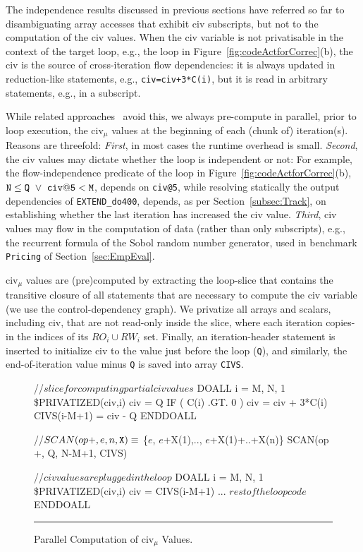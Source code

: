 \documentclass{sig-alternate}
\newcommand{\mymath}[1]{$ #1 $}
\begin{document}
The independence results discussed in previous sections have referred 
so far to disambiguating array accesses that exhibit {\sc civ} 
subscripts, but not to the computation of the {\sc civ} values.
%
When the {\sc civ} variable is not privatisable in the context of the 
target loop, e.g., the loop in Figure~\ref{fig:codeActforCorrec}(b), 
the {\sc civ} is the source of cross-iteration flow dependencies: %
it is always updated in reduction-like statements, e.g., {\tt civ=civ+3*C(i)},
but it is read in arbitrary statements, e.g., in a subscript.


While related approaches~\cite{PaduaStackArr,VEG} avoid this, we always pre-compute in
parallel, prior to loop execution, the {\sc civ}$_\mu$ values at the beginning 
of each (chunk of) iteration(s).
Reasons are threefold: {\em First}, in most cases %
the runtime overhead is small. {\em Second}, the {\sc civ} values may dictate
whether the loop is independent or not: For example,  the flow-independence
predicate of the loop in Figure~\ref{fig:codeActforCorrec}(b), 
${\tt N} \le {\tt Q}~\vee~{\tt civ@5} < {\tt M}$,
depends on {\tt civ@5}, while resolving statically the output 
dependencies of {\tt EXTEND\_do400}, depends, as
per Section~\ref{subsec:Track}, on establishing whether the last
iteration has increased the {\sc civ} value. 
%
{\em Third}, {\sc civ} values may flow in the computation
of data (rather than only subscripts), e.g., the recurrent
formula of the Sobol random number generator, used in
benchmark {\tt Pricing}  of Section~\ref{sec:EmpEval}.

{\sc civ}$_\mu$ values are (pre)computed by extracting the loop-slice
that contains the transitive closure of all statements 
that are necessary to compute the {\sc civ} variable
(we use the control-dependency graph). 
We privatize all arrays and scalars, including {\sc civ}, that are not 
read-only inside the slice, where each iteration copies-in the  indices 
of its $RO_i \cup RW_i$ set. Finally, an iteration-header statement is 
inserted to initialize {\sc civ} to the value just before the loop ({\tt Q}), 
and similarly, the end-of-iteration value minus {\tt Q} is saved into array 
{\tt CIVS}.  


\begin{figure}
\begin{colorcode}
//\mymath{slice for computing partial civ values}
DOALL i = M, N, 1      \$PRIVATIZED(civ,i)
  civ = Q
  IF ( C(i) .GT. 0 ) civ = civ + 3*C(i)
  CIVS(i-M+1) = civ - Q
ENDDOALL

//\mymath{SCAN(op {\tt{}+}, e, n, {\tt{}X}) \equiv} \{\mymath{e}, \mymath{e}+X(1),.., \mymath{e}+X(1)+..+X(n)\}
SCAN(op +, Q, N-M+1, CIVS)

//\mymath{civ values are plugged in the loop}
DOALL i = M, N, 1      \$PRIVATIZED(civ,i)
  civ = CIVS(i-M+1)
  ... \mymath{rest of the loop code}
ENDDOALL
\end{colorcode}
\vspace{-1ex}
\hrule
\vspace{-0.5ex}
\caption{ Parallel Computation of {\sc civ}$_\mu$ Values.}
\label{fig:CivSlice} %
\end{figure}
\end{document}
